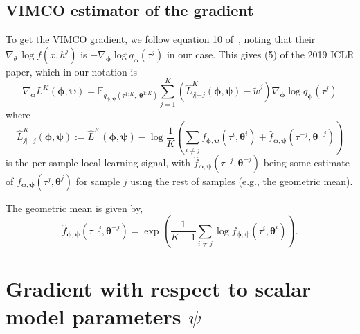 \documentclass{article}
\newcommand{\bParam}{\bm{\theta}}
\begin{document}
\subsection*{VIMCO estimator of the gradient}


To get the VIMCO gradient, we follow equation 10 of~\cite{Mnih2016-ec}, noting that their $\nabla_\theta \, \log f(x, h^j)$ is $-\nabla_{\bm{\phi}} \log q_{\bm{\phi}}(\tau^j)$ in our case.
This gives (5) of the 2019 ICLR paper, which in our notation is
\[
\nabla_{\bm{\phi}} L^K(\bm{\phi},{\bm{\psi}}) = \mathbb{E}_{q_{\bm{\phi},{\bm{\psi}}}(\tau^{1:K},\;\bm{\theta}^{1:K})}\sum_{j=1}^K\left(\hat{L}_{j|-j}^K(\bm{\phi},{\bm{\psi}})-\tilde{w}^j\right)\nabla_{\bm{\phi}}\log q_{\bm{\phi}}(\tau^j)
\]
where
\[
\hat{L}_{j|-j}^K(\bm{\phi},{\bm{\psi}}) :=  \hat{L}^K(\bm{\phi},{\bm{\psi}}) - \log\frac1K\left(\sum_{i\neq j}f_{\bm{\phi},{\bm{\psi}}}(\tau^i,\bm{\theta}^i) + \hat{f}_{\bm{\phi},{\bm{\psi}}}(\tau^{-j},\bm{\theta}^{-j})\right)
\]
is the per-sample local learning signal, with $\hat{f}_{\bm{\phi},{\bm{\psi}}}(\tau^{-j},\bm{\theta}^{-j})$ being some estimate of $f_{\bm{\phi},{\bm{\psi}}}(\tau^j,\bm{\theta}^j)$ for sample $j$ using the rest of samples (e.g., the geometric mean).

The geometric mean is given by,
\begin{equation}\label{eq:f_hat}
    \hat{f}_{\bm{\phi}, \bm{\psi}}(\tau^{-j}, \bm{\theta}^{-j})  = \exp\left( \frac{1}{K-1} \sum_{i \not= j} \log f_{\bm{\phi}, \bm{\psi}}(\tau^i, \bm{\theta}^i) \right).
\end{equation}



\section*{Gradient with respect to scalar model parameters $\psi$}
\end{document}
